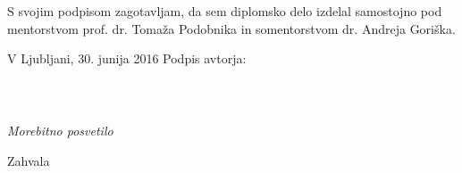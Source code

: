 \vspace{1.5cm}
S svojim podpisom zagotavljam, da sem diplomsko delo izdelal samostojno pod mentorstvom 
prof. dr. Tomaža Podobnika in somentorstvom dr. Andreja Goriška.

\vspace{1cm}
V Ljubljani, 30. junija 2016 \hspace{2.5cm} Podpis avtorja:
\newpage

\ \thispagestyle{empty}
\newpage

\thispagestyle{empty}

$\;$ 

\vspace{5cm}
\hfill {\Large \em Morebitno posvetilo}
\thispagestyle{empty}

\vfill
Zahvala
\newpage

\newpage

\renewcommand\thepage{} 
\tableofcontents 
\renewcommand\thepage{\arabic{page}}
\thispagestyle{empty}


\newpage

\setcounter{page}{1}


\thispagestyle{empty}
\newpage
